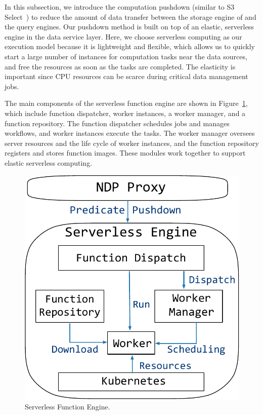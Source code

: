 In this subsection, we introduce the computation pushdown (similar to S3 Select~\cite{s3}) to reduce the amount of data transfer between the  storage engine of \sys and the query engines.  Our pushdown method is built on top of an elastic, serverless engine in the data service layer. Here, we choose serverless computing as our execution model because it is lightweight  and flexible, which allows us to quickly start a large number of instances for computation tasks near the data sources, and free the resources as soon as the tasks are completed. The elasticity is important since CPU resources can be scarce during critical data management jobs.

The main components of the serverless function engine are shown in Figure~\ref{fig:serverless}, which include function dispatcher, worker instances, a worker manager, and a function repository. The function dispatcher schedules jobs and manages workflows, and worker instances execute the tasks. The worker manager oversees server resources and the life cycle of worker instances, and the function repository registers and stores function images. These modules work together to support elastic serverless computing.



\begin{figure}[htbp]
	\includegraphics[scale=0.35]{figures/serverless}
	\centering
	\vspace{-1em}
	\caption{Serverless Function Engine.}
	\label{fig:serverless}
	\vspace{-1em}
\end{figure}

